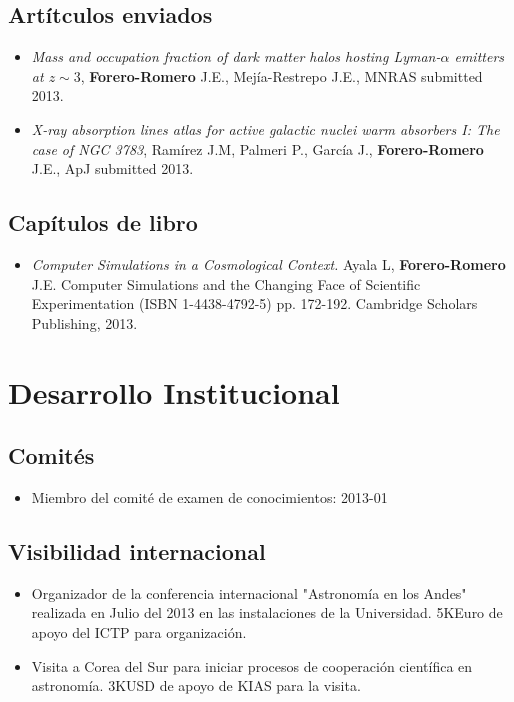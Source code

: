 \documentclass{article}
\begin{document}
\subsection*{Art\'itculos enviados}

\begin{itemize}
\item {\it Mass and occupation fraction of dark matter halos hosting Lyman-$\alpha$
  emitters at $z\sim 3$}, {\bf Forero-Romero} J.E., Mej\'ia-Restrepo
  J.E., MNRAS submitted 2013.
\item {\it X-ray absorption lines atlas for active galactic nuclei
  warm absorbers I: The case of NGC 3783}, Ram\'irez  J.M, Palmeri P.,
  Garc\'ia J., {\bf Forero-Romero} J.E., ApJ submitted 2013.
\end{itemize}

\subsection*{Cap\'itulos de libro}
\begin{itemize}
\item {\it Computer Simulations in a Cosmological Context.} Ayala L, {\bf Forero-Romero} J.E. Computer Simulations and the Changing Face of Scientific Experimentation (ISBN 1-4438-4792-5) pp. 172-192. Cambridge Scholars Publishing, 2013.
\end{itemize}

\section*{Desarrollo Institucional}

\subsection*{Comit\'es}

\begin{itemize}
\item {Miembro del comit\'e de examen de conocimientos}: 2013-01
\end{itemize}

\subsection*{Visibilidad internacional}

\begin{itemize}
\item {Organizador de la conferencia internacional "Astronom\'ia en los
  Andes" realizada en Julio del 2013 en las instalaciones de la Universidad. 5KEuro de apoyo del ICTP para organizaci\'on.}
\item {Visita a Corea del Sur para iniciar procesos de cooperaci\'on
  cient\'ifica en astronom\'ia. 3KUSD de apoyo de KIAS para la visita.}
\end{itemize}
\end{document}
